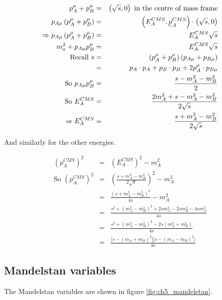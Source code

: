 \begin{eqnarray*}
  p^{\mu}_A + p^{\mu}_B & = & \left(\sqrt{s},0\right) \textrm{ in the centre of mass frame} \\
  p_{A\mu}\left(p^{\mu}_A + p^{\mu}_B \right) & = & \left(E^{CMS}_A,\underline{p}^{CMS}_A\right) \cdot \left(\sqrt{s},0\right) \\
  \Rightarrow p_{A\mu} \left(p^{\mu}_A + p^{\mu}_B\right) & = & E^{CMS}_A \sqrt{s} \\
  m^2_a + p_{A\mu}p^{\mu}_B & = & E^{CMS}_A \sqrt{s} \\
  \textrm{Recall } s & = & \left( p^{\mu}_A + p^{\mu}_B\right)\left(p_{A\mu} + p_{B\mu}\right) \\
  & = & p_A \cdot p_A + p_B \cdot p_B + 2p^{\mu}_A\cdot p_{B\mu} \\
  \textrm{So } p_{A\mu}p^{\mu}_B & = & \frac{s - m^2_A - m^2_B}{2} \\
  \textrm{So } E^{CMS}_A & = & \frac{2m^2_A + s - m^2_A - m^2_B}{2\sqrt{s}} \\
  \Rightarrow E^{CMS}_A & = & \frac{s + m^2_A - m^2_B}{2\sqrt{s}}
\end{eqnarray*}

And similarly for the other energies.

\begin{eqnarray*}
  \left( p^{CMS}_A \right)^2 & = & \left( E^{CMS}_A \right)^2 - m^2_A \\
  \textrm{So } \left(p^{CMS}_A\right)^2 & = & \left( \frac{s + m^2_A - m^2_B}{2\sqrt{s}}\right)^2 - m^2_A \\
  & = & \frac{\left(s + m^2_A - m^2_B\right)^2}{4s}-m^2_A \\
  & = & \frac{s^2 + \left(m^2_A - m^2_B\right)^2 + 2sm^2_A - 2sm^2_B - 4sm^2_A}{4s} \\
  & = & \frac{s^2 + \left(m^2_A - m^2_B\right)^2 - 2s\left(m^2_A + m^2_B\right)}{4s} \\
  & = & \frac{\lbrack s - \left(m_A + m_B\right)^2\rbrack \lbrack s - \left(m_A - m_B\right)^2 \rbrack}{4s}
\end{eqnarray*}

\subsection{Mandelstan variables}

The Mandelstan variables are shown in figure \ref{fig:ch5_mandelstan}.

